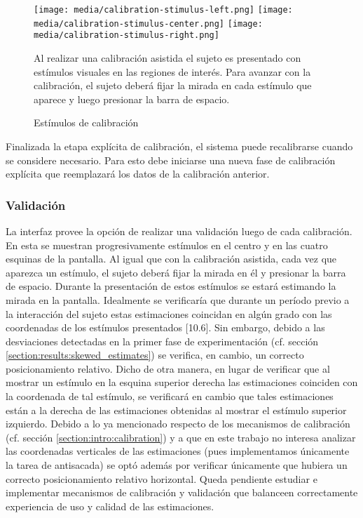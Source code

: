 \begin{figure}
    \centering
    \texttt{[image: media/calibration-stimulus-left.png]}
    \texttt{[image: media/calibration-stimulus-center.png]}
    \texttt{[image: media/calibration-stimulus-right.png]}
    \caption{Estímulos de calibración}
    Al realizar una calibración asistida el sujeto es presentado con estímulos
    visuales en las regiones de interés.
    Para avanzar con la calibración, el sujeto deberá fijar la mirada en cada
    estímulo que aparece y luego presionar la barra de espacio.
    \label{fig:calibration_stimulus}
\end{figure}

Finalizada la etapa explícita de calibración, el sistema puede recalibrarse
cuando se considere necesario.
Para esto debe iniciarse una nueva fase de calibración explícita que
reemplazará los datos de la calibración anterior.

\subsubsection{Validación}

La interfaz \jspsych provee la opción de realizar una validación luego de cada
calibración.
En esta se muestran progresivamente estímulos en el centro y en las cuatro
esquinas de la pantalla.
Al igual que con la calibración asistida, cada vez que aparezca un estímulo, el
sujeto deberá fijar la mirada en él y presionar la barra de espacio.
Durante la presentación de estos estímulos se estará estimando la mirada en la
pantalla.
Idealmente se verificaría que durante un período previo a la interacción del
sujeto estas estimaciones coincidan en algún grado con las coordenadas de los
estímulos presentados [10.6].
Sin embargo, debido a las desviaciones detectadas en la primer fase de
experimentación (cf. sección \ref{section:results:skewed_estimates}) se
verifica, en cambio, un correcto posicionamiento relativo.
Dicho de otra manera, en lugar de verificar que al mostrar un estímulo en la
esquina superior derecha las estimaciones coinciden con la coordenada de tal
estímulo, se verificará en cambio que tales estimaciones están a la derecha de
las estimaciones obtenidas al mostrar el estímulo superior izquierdo.
Debido a lo ya mencionado respecto de los mecanismos de calibración (cf.
sección \ref{section:intro:calibration}) y a que en este trabajo no interesa
analizar las coordenadas verticales de las estimaciones (pues implementamos
únicamente la tarea de antisacada) se optó además por verificar únicamente que
hubiera un correcto posicionamiento relativo horizontal.
Queda pendiente estudiar e implementar mecanismos de calibración y validación
que balanceen correctamente experiencia de uso y calidad de las estimaciones.

